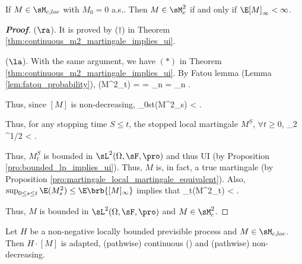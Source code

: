 
\begin{theorem}\label{thm:martingale_l2_iff_quadratic_variation_infinity_non_infinity}
If $M \in \sM_{c,loc}$ with $M_0 = 0$ a.s.. Then $M \in \sM^2_c$ if and only if $\E [M]_\infty < \infty$.
\end{theorem}

\begin{proof}[\bf Proof]
($\ra$). It is proved by ($\dag$) in Theorem \ref{thm:continuous_m2_martingale_implies_ui}.

($\la$). With the same argument, we have $(*)$ in Theorem \ref{thm:continuous_m2_martingale_implies_ui}. By Fatou lemma (Lemma \ref{lem:fatou_probability}),
\be
\E(M^2_t) = \E{} = \E{} \leq \liminf_{n}\E{} = \liminf_n \E{} \leq \E{}.
\ee

Thus, since $[M]$ is non-decreasing,
\be
\sup_{0\leq s\leq t}\E(M^2_s) \leq \E{} \leq \E\brb{[M]_\infty} < \infty.
\ee

Thus, for any stopping time $S\leq t$, the stopped local martingale $M^S$, $\forall t\geq 0$, %
\be
{}_2 \leq {}^{1/2} < \infty. %
\ee

Thus, $M^S_t$ is bounded in $\sL^2(\Omega,\sF,\pro)$ and thus UI (by Proposition \ref{pro:bounded_lp_implies_ui}). Thus, $M$ is, in fact, a true martingale (by Proposition \ref{pro:martingale_local_martingale_equivalent}). Also, $\sup_{0\leq s\leq t}\E(M^2_s)  \leq \E\brb{[M]_\infty}$ implies that
\be
\sup_{t}\E(M^2_t) \leq \E\brb{[M]_\infty} < \infty.
\ee

Thus, $M$ is bounded in $\sL^2(\Omega,\sF,\pro)$ and $M \in \sM_c^2$.
\end{proof}





\begin{corollary}\label{cor:locally_bounded_previsible_quadratic_variation_integral}
Let $H$ be a non-negative locally bounded previsible process and $M\in \sM_{c,loc}$. Then $H\cdot [M]$ is adapted, (pathwise) continuous (\cadlag) and (pathwise) non-decreasing.
\end{corollary}


